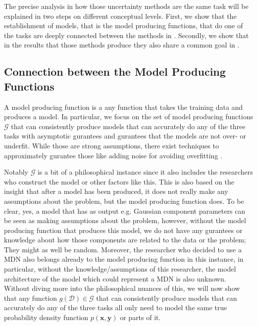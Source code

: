The precise analysis in how those uncertainty methods are the same task will be explained in two steps on different conceptual levels. First, we show that the establishment of models, that is the model producing functions, that do one of the tasks are deeply connected between the methods in . Secondly, we show that in the results that those methods produce they also share a common goal in .

\subsection{Connection between the Model Producing Functions}\label{sec:connection_model_producing}

A model producing function is a any function that takes the training data and produces a model. In particular, we focus on the set of model producing functions $\mathcal{G}$ that can consistently produce models that can accurately do any of the three tasks with asymptotic gurantees and gurantees that the models are not over- or underfit. While those are strong assumptions, there exist techniques to approximately gurantee those like adding noise for avoiding overfitting \cite{rothfuss2019noise}.

Notably $\mathcal{G}$ is a bit of a philosophical instance since it also includes the researchers who construct the model or other factors like this. This is also based on the insight that after a model has been produced, it does not really make any assumptions about the problem, but the model producing function does. To be clear, yes, a model that has as output e.g. Gaussian component parameters can be seen as making assumptions about the problem, however, without the model producing function that produces this model, we do not have any gurantees or knowledge about how those components are related to the data or the problem; They might as well be random. Moreover, the researcher who decided to use a MDN also belongs already to the model producing function in this instance, in particular, without the knowledge/assumptions of this researcher, the model architecture of the model which could represent a MDN is also unknown.\\
Without diving more into the philosophical nuances of this, we will now show that any function $g(\mathcal{D}) \in \mathcal{G}$ that can consistently produce models that can accurately do any of the three tasks all only need to model the same true probability density function $p(\mathbf{x}, \mathbf{y})$ or parts of it.


